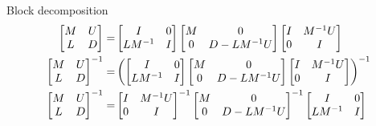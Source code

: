 %
Block decomposition
%
\begin{align*}
    \begin{bmatrix}
        M & U \\
        L & D
    \end{bmatrix}
    =&
    \begin{bmatrix}
        I & 0 \\
        L M^{-1} & I
    \end{bmatrix}
    \begin{bmatrix}
        M & 0 \\
        0 & D-L M^{-1} U
    \end{bmatrix}
    \begin{bmatrix}
        I & M^{-1} U \\
        0 & I
    \end{bmatrix}
    \\
     \begin{bmatrix}
        M & U \\
        L & D
    \end{bmatrix}
    ^{-1}
    =&
    \L(
    \begin{bmatrix}
        I & 0 \\
        L M^{-1} & I
    \end{bmatrix}
    \begin{bmatrix}
        M & 0 \\
        0 & D-L M^{-1} U
    \end{bmatrix}
    \begin{bmatrix}
        I & M^{-1} U \\
        0 & I
    \end{bmatrix}
    \R)^{-1}
    \\
     \begin{bmatrix}
        M & U \\
        L & D
    \end{bmatrix}
    ^{-1}
    =&
    \begin{bmatrix}
        I & M^{-1} U \\
        0 & I
    \end{bmatrix}
    ^{-1}
    \begin{bmatrix}
        M & 0 \\
        0 & D-L M^{-1} U
    \end{bmatrix}
    ^{-1}
    \begin{bmatrix}
        I & 0 \\
        L M^{-1} & I
    \end{bmatrix}

\end{align*}
